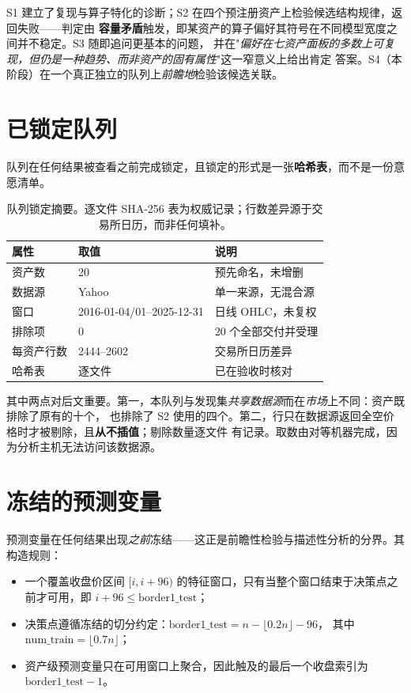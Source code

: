 \documentclass[conference]{IEEEtran}
\begin{document}
S1 建立了复现与算子特化的诊断；S2 在四个预注册资产上检验候选结构规律，返回失败——判定由
\textbf{容量矛盾}触发，即某资产的算子偏好其符号在不同模型宽度之间并不稳定。S3 随即追问更基本的问题，
并在"\emph{偏好在七资产面板的多数上可复现，但仍是一种趋势、而非资产的固有属性}"这一窄意义上给出肯定
答案。S4（本阶段）在一个真正独立的队列上\emph{前瞻地}检验该候选关联。

\section{已锁定队列}
\label{sec:cohort}

队列在任何结果被查看之前完成锁定，且锁定的形式是一张\textbf{哈希表}，而不是一份意愿清单。

\begin{table}[!t]
\centering
\footnotesize
\setlength{\tabcolsep}{3pt}
\begin{tabular}{@{}p{}p{}p{}@{}}
\toprule
属性 & 取值 & 说明 \\
\midrule
资产数 & 20 & 预先命名，未增删 \\
数据源 & Yahoo & 单一来源，无混合源 \\
窗口 & 2016-01-04/01--2025-12-31 & 日线 OHLC，未复权 \\
排除项 & 0 & 20 个全部交付并受理 \\
每资产行数 & 2444--2602 & 交易所日历差异 \\
哈希表 & 逐文件 & 已在验收时核对 \\
\bottomrule
\end{tabular}
\caption{队列锁定摘要。逐文件 SHA-256 表为权威记录；行数差异源于交易所日历，而非任何填补。}
\label{tab:cohort}
\end{table}

其中两点对后文重要。第一，本队列与发现集\emph{共享数据源}而在\emph{市场}上不同：资产既排除了原有的十个，
也排除了 S2 使用的四个。第二，行只在数据源返回全空价格时才被剔除，且\textbf{从不插值}；剔除数量逐文件
有记录。取数由对等机器完成，因为分析主机无法访问该数据源。

\section{冻结的预测变量}
\label{sec:pred}

预测变量在任何结果出现\emph{之前}冻结——这正是前瞻性检验与描述性分析的分界。其构造规则：

\begin{itemize}
\item 一个覆盖收盘价区间 $[i, i+96)$ 的特征窗口，只有当整个窗口结束于决策点之前才可用，即
$i+96 \le \mathrm{border1\_test}$；
\item 决策点遵循冻结的切分约定：$\mathrm{border1\_test} = n - \lfloor 0.2n \rfloor - 96$，
其中 $\mathrm{num\_train} = \lfloor 0.7n \rfloor$；
\item 资产级预测变量只在可用窗口上聚合，因此触及的最后一个收盘索引为
$\mathrm{border1\_test} - 1$。
\end{itemize}
\end{document}
